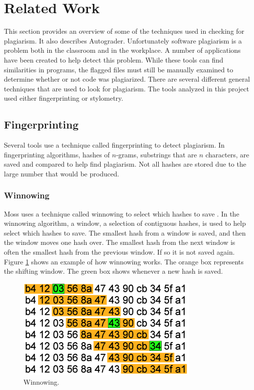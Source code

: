 \documentclass[10pt,journal,compsoc]{IEEEtran}
\begin{document}
	\section{Related Work}
	This section provides an overview of some of the techniques used in checking for plagiarism. It also describes Autograder. Unfortunately software plagiarism is a problem both in the classroom and in the workplace. A number of applications have been created to help detect this problem. While these tools can find similarities in programs, the flagged files must still be manually examined to determine whether or not code was plagiarized. There are several different general techniques that are used to look for plagiarism. The tools analyzed in this project used either fingerprinting or stylometry.
		
		\subsection{Fingerprinting}
		Several tools use a technique called fingerprinting to detect plagiarism. In fingerprinting algorithms, hashes of $n$-grams, substrings that are $n$ characters, are saved and compared to help find plagiarism. Not all hashes are stored due to the large number that would be produced. 
		
			\subsubsection{Winnowing}
			Moss uses a technique called winnowing to select which hashes to save \cite{schleimer+wilkerson+aiken}. In the winnowing algorithm, a window, a selection of contiguous hashes, is used to help select which hashes to save. The smallest hash from a window is saved, and then the window moves one hash over. The smallest hash from the next window is often the smallest hash from the previous window. If so it is not saved again. Figure \ref{fig:winnowing1} shows an example of how winnowing works. The orange box represents the shifting window. The green box shows whenever a new hash is saved.
		
			\begin{figure}[h!]
				\includegraphics[width=0.8\textwidth]{Winnowing.png}
				\caption{Winnowing.}
				\label{fig:winnowing1}
			\end{figure}
		
\end{document}
